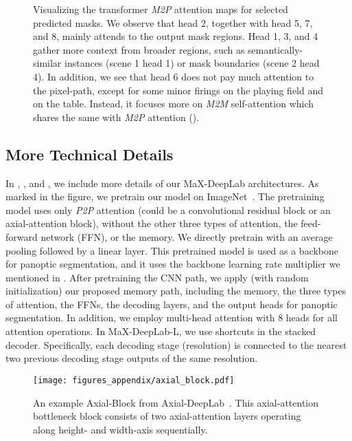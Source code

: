 \begin{figure*}[!p]
\begin{tabular}{ccccc}
    \midrule
    \end{tabular}
    \vspace{3pt}
    \caption{Visualizing the transformer {\it M2P} attention maps for selected predicted masks. We observe that head 2, together with head 5, 7, and 8, mainly attends to the output mask regions. Head 1, 3, and 4 gather more context from broader regions, such as semantically-similar instances (scene 1 head 1) or mask boundaries (scene 2 head 4). In addition, we see that head 6 does not pay much attention to the pixel-path, except for some minor firings on the playing field and on the table. Instead, it focuses more on {\it M2M} self-attention which shares the same  with {\it M2P} attention ().}
    \label{fig:attention}
\end{figure*}


\subsection{More Technical Details}
\label{sec:appendix_details}
In , , and , we include more details of our MaX-DeepLab architectures. As marked in the figure, we pretrain our model on ImageNet~\cite{krizhevsky2012imagenet}. The pretraining model uses only {\it P2P} attention (could be a convolutional residual block or an axial-attention block), without the other three types of attention, the feed-forward network (FFN), or the memory. We directly pretrain with an average pooling followed by a linear layer. This pretrained model is used as a backbone for panoptic segmentation, and it uses the backbone learning rate multiplier we mentioned in . After pretraining the CNN path, we apply (with random initialization) our proposed memory path, including the memory, the three types of attention, the FFNs, the decoding layers, and the output heads for panoptic segmentation. In addition, we employ multi-head attention with 8 heads for all attention operations. In MaX-DeepLab-L, we use shortcuts in the stacked decoder. Specifically, each decoding stage (resolution) is connected to the nearest two previous decoding stage outputs of the same resolution.

\begin{figure*}[!t]
    \centering
    \texttt{[image: figures\_appendix/axial\_block.pdf]}
    \caption{An example Axial-Block from Axial-DeepLab~\cite{wang2020axial}. This axial-attention bottleneck block consists of two axial-attention layers operating along height- and width-axis sequentially.}
    \label{fig:axial_block}
\end{figure*}

